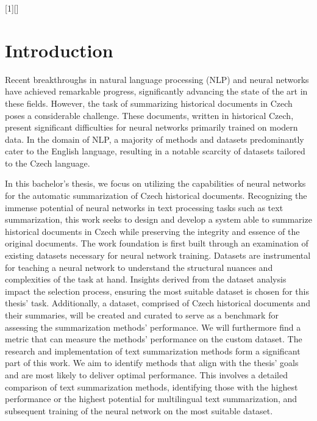 \documentclass[english, ba, kiv, he, iso690numb, pdf, viewonly]{fasthesis}
\begin{document}
	[]
	{
		\lstset{style=FASThesisPythonStyle, language=Python, #1}
	}
	{
	}
	
	\setcounter{page}{1}
	\chapter{Introduction}
	Recent breakthroughs in natural language processing (NLP) and neural networks have achieved remarkable progress, significantly advancing the state of the art in these fields. However, the task of summarizing historical documents in Czech poses a considerable challenge. These documents, written in historical Czech, present significant difficulties for neural networks primarily trained on modern data. In the domain of NLP, a majority of methods and datasets predominantly cater to the English language, resulting in a notable scarcity of datasets tailored to the Czech language.
	
	In this bachelor's thesis, we focus on utilizing the capabilities of neural networks for the automatic summarization of Czech historical documents. Recognizing the immense potential of neural networks in text processing tasks such as text summarization, this work seeks to design and develop a system able to summarize historical documents in Czech while preserving the integrity and essence of the original documents. The work foundation is first built through an examination of existing datasets necessary for neural network training. Datasets are instrumental for teaching a neural network to understand the structural nuances and complexities of the task at hand. Insights derived from the dataset analysis impact the selection process, ensuring the most suitable dataset is chosen for this thesis' task. Additionally, a dataset, comprised of Czech historical documents and their summaries, will be created and curated to serve as a benchmark for assessing the summarization methods' performance. We will furthermore find a metric that can measure the methods' performance on the custom dataset. The research and implementation of text summarization methods form a significant part of this work. We aim to identify methods that align with the thesis' goals and are most likely to deliver optimal performance. This involves a detailed comparison of text summarization methods, identifying those with the highest performance or the highest potential for multilingual text summarization, and subsequent training of the neural network on the most suitable dataset.
	
\end{document}
